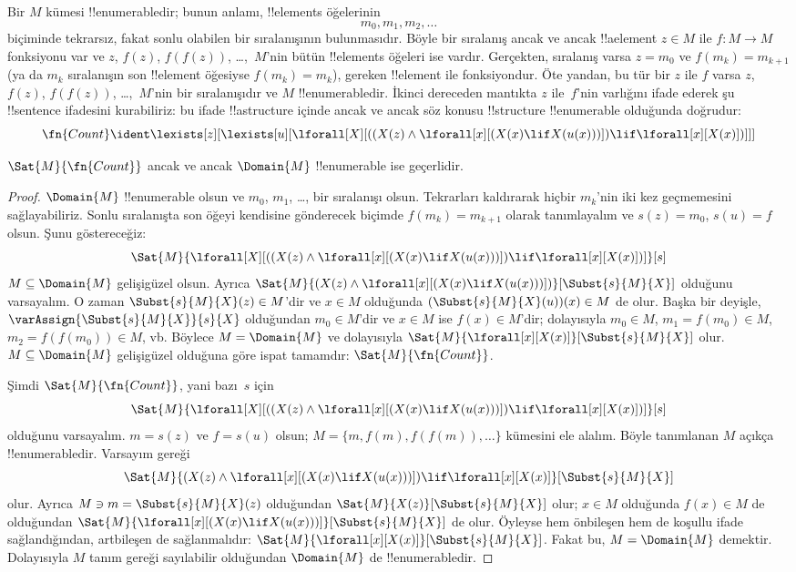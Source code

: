 \documentclass[../../../include/open-logic-section]{subfiles}
\begin{document}
Bir $M$ kümesi !!{enumerable}{}dir; bunun anlamı, !!{element}s öğelerinin
\[
m_0, m_1, m_2, \dots
\]
biçiminde tekrarsız, fakat sonlu olabilen bir sıralanışının bulunmasıdır.
Böyle bir
sıralanış ancak ve ancak !!a{element}
$z \in M$ ile $f\colon M \to M$ fonksiyonu var ve $z$, $f(z)$,
$f(f(z))$, \dots,~$M$'nin bütün !!{element}s öğeleri ise vardır.
Gerçekten, sıralanış varsa $z=m_0$ ve $f(m_k)=m_{k+1}$ (ya da $m_k$
sıralanışın son !!{element} öğesiyse $f(m_k)=m_k$), gereken !!{element}
ile fonksiyondur. Öte yandan, bu tür bir $z$ ile $f$ varsa $z$, $f(z)$,
$f(f(z))$, \dots,~$M$'nin bir sıralanışıdır ve $M$ !!{enumerable}{}dir.
İkinci dereceden mantıkta $z$ ile~$f$'nin varlığını ifade ederek şu
!!{sentence} ifadesini kurabiliriz: bu ifade !!a{structure} içinde ancak ve
ancak söz konusu !!{structure} !!{enumerable} olduğunda doğrudur:
\[
\fn{Count} \ident
\lexists[z][\lexists[u][\lforall[X][((X(z) \land
      \lforall[x][(X(x) \lif X(u(x)))]) \lif \lforall[x][X(x)])]]]
\]

\begin{prop}
$\Sat{M}{\fn{Count}}$ ancak ve ancak $\Domain{M}$ !!{enumerable} ise
geçerlidir.
\end{prop}

\begin{proof}
$\Domain{M}$ !!{enumerable} olsun ve $m_0$, $m_1$, \dots, bir sıralanışı
olsun. Tekrarları kaldırarak hiçbir $m_k$'nin iki kez geçmemesini
sağlayabiliriz. Sonlu sıralanışta son öğeyi kendisine gönderecek biçimde
$f(m_k)=m_{k+1}$ olarak tanımlayalım ve $s(z)=m_0$,
$s(u)=f$ olsun. Şunu göstereceğiz:
\[
\Sat{M}{\lforall[X][((X(z) \land \lforall[x][(X(x) \lif X(u(x)))] )
    \lif \lforall[x][X(x)])]}[s]
\]
$M \subseteq \Domain{M}$ gelişigüzel olsun. Ayrıca
$\Sat{M}{(X(z) \land \lforall[x][(X(x) \lif
X(u(x)))])}[\Subst{s}{M}{X}]$ olduğunu varsayalım. O zaman
$\Subst{s}{M}{X}(z) \in M$'dir ve $x \in M$ olduğunda
$(\Subst{s}{M}{X}(u))(x) \in M$ de olur. Başka bir deyişle,
$\varAssign{\Subst{s}{M}{X}}{s}{X}$ olduğundan $m_0 \in M$'dir ve
$x \in M$ ise $f(x) \in M$'dir; dolayısıyla $m_0 \in M$,
$m_1=f(m_0) \in M$, $m_2=f(f(m_0)) \in M$, vb. Böylece
$M=\Domain{M}$ ve dolayısıyla
$\Sat{M}{\lforall[x][X(x)]}[\Subst{s}{M}{X}]$ olur.
$M \subseteq \Domain{M}$ gelişigüzel olduğuna göre ispat tamamdır:
$\Sat{M}{\fn{Count}}$.

Şimdi $\Sat{M}{\fn{Count}}$, yani bazı~$s$ için
\[
\Sat{M}{\lforall[X][((X(z) \land \lforall[x][(X(x) \lif X(u(x)))] )
    \lif \lforall[x][X(x)])]}[s]
\]
olduğunu varsayalım. $m=s(z)$ ve $f=s(u)$ olsun;
$M=\{m,f(m),f(f(m)),\dots\}$ kümesini ele alalım. Böyle tanımlanan $M$
açıkça !!{enumerable}{}dir. Varsayım gereği
\[
\Sat{M}{(X(z) \land \lforall[x][(X(x) \lif X(u(x)))] )
    \lif \lforall[x][X(x)]}[\Subst{s}{M}{X}]
\]
olur. Ayrıca $M \ni m=\Subst{s}{M}{X}(z)$ olduğundan
$\Sat{M}{X(z)}[\Subst{s}{M}{X}]$ olur; $x \in M$ olduğunda
$f(x) \in M$ de olduğundan
$\Sat{M}{\lforall[x][(X(x) \lif X(u(x)))]}[\Subst{s}{M}{X}]$ de olur.
Öyleyse hem önbileşen hem de koşullu ifade sağlandığından, artbileşen de
sağlanmalıdır:
$\Sat{M}{\lforall[x][X(x)]}[\Subst{s}{M}{X}]$. Fakat bu,
$M=\Domain{M}$ demektir. Dolayısıyla $M$ tanım gereği sayılabilir
olduğundan $\Domain{M}$ de !!{enumerable}{}dir.
\end{proof}
\end{document}
